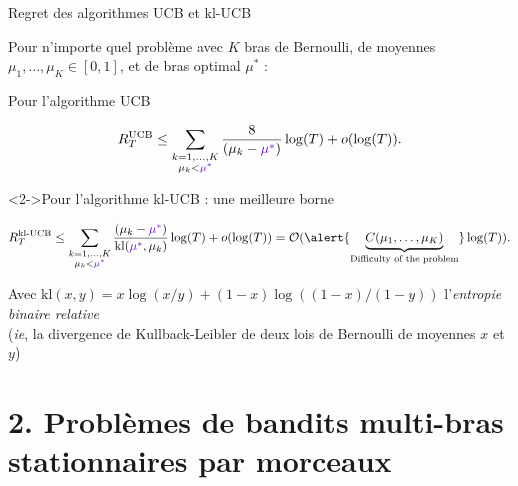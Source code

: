 \documentclass[11pt,french,ignorenonframetext,]{beamer}
\begin{document}
\begin{frame}{Regret des algorithmes UCB et kl-UCB}

  Pour n'importe quel problème avec $K$ bras de Bernoulli, de moyennes $\mu_1,\dots,\mu_K \in[0,1]$, et de \textcolor{deeppurple}{bras optimal $\mu^*$} :

  \begin{exampleblock}{Pour l'algorithme UCB}
    \begin{small}
      \[ R_T^{\mathrm{UCB}} \leq \sum_{\substack{k=1,\dots,K \\ \mu_k < \textcolor{deeppurple}{\mu^*}}} \frac{8}{(\mu_k - \textcolor{deeppurple}{\mu^*})} \log(T) + o(\log(T)). \]
    \end{small}%
  \end{exampleblock}

  \begin{exampleblock}<2->{Pour l'algorithme kl-UCB : une meilleure borne}
    \begin{small}
      \[ R_T^{\mathrm{kl}\text{-}\mathrm{UCB}} \leq \sum_{\substack{k=1,\dots,K \\ \mu_k < \textcolor{deeppurple}{\mu^*}}} \frac{(\mu_k - \textcolor{deeppurple}{\mu^*})}{\mathrm{kl}(\textcolor{deeppurple}{\mu^*}, \mu_k)} \log(T) + o(\log(T)) = \mathcal{O}( \alert{\underbrace{C(\mu_1,\dots,\mu_K)}_{\text{Difficulty of the problem}}} \log(T) ). \]
    \end{small}%
    \begin{footnotesize}
      Avec $\mathrm{kl}(x, y) = x \log(x/y) + (1-x) \log((1-x)/(1-y))$ l'\emph{entropie binaire relative}\\
      (\emph{ie}, la divergence de Kullback-Leibler de deux lois de Bernoulli de moyennes $x$ et $y$)
    \end{footnotesize}%
  \end{exampleblock}

\end{frame}


\section{\hfill{}2. Problèmes de bandits multi-bras stationnaires par morceaux\hfill{}}
\end{document}
